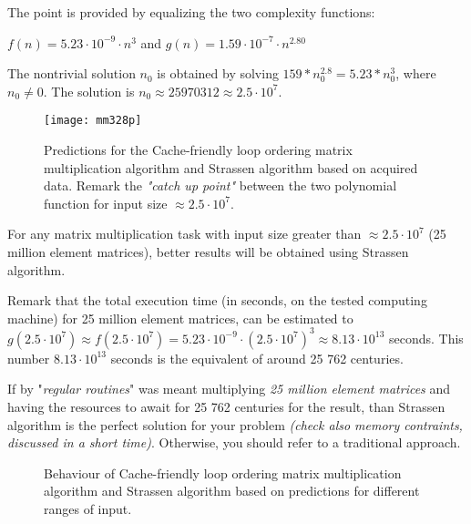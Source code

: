 The point is provided by equalizing the two complexity functions:

$f(n) = 5.23 \cdot 10^{-9} \cdot n^{3} $ and $g(n) = 1.59 \cdot 10^{-7} \cdot n^{2.80} $

The nontrivial solution $n_{0}$ is obtained by solving $ 159 * n_{0}^{2.8} = 5.23* n_{0}^3 $, where $n_{0} \neq 0$. The solution is $n_{0} \approx 25970312 \approx 2.5 \cdot 10^7$.

\begin{figure}[H]
\centering
\texttt{[image: mm328p]}
\caption{Predictions for the Cache-friendly loop ordering matrix multiplication algorithm and Strassen algorithm based on acquired data. Remark the \textit{"catch up point"} between the two polynomial function for input size $\approx 2.5 \cdot 10^7$. }
\end{figure}

For any matrix multiplication task with input size greater than $\approx 2.5 \cdot 10^7$ (25 million element matrices), better results will be obtained using Strassen algorithm.

Remark that the total execution time (in seconds, on the tested computing machine) for 25 million element matrices, can be estimated to $g(2.5 \cdot 10^7) \approx f(2.5 \cdot 10^7) = 5.23 \cdot 10^{-9} \cdot (2.5 \cdot 10^7)^{3} \approx 8.13 \cdot 10^{13}$ seconds. This number $8.13 \cdot 10^{13} $ seconds is the equivalent of around 25 762 centuries.

If by "\textit{regular routines}" was meant multiplying \textit{25 million element matrices} and having the resources to await for 25 762 centuries for the result, than Strassen algorithm is the perfect solution for your problem \textit{(check also memory contraints, discussed in a short time)}. Otherwise, you should refer to a traditional approach.

\begin{figure}[H]
\caption{Behaviour of Cache-friendly loop ordering matrix multiplication algorithm and Strassen algorithm based on predictions for different ranges of input.}
\end{figure}


